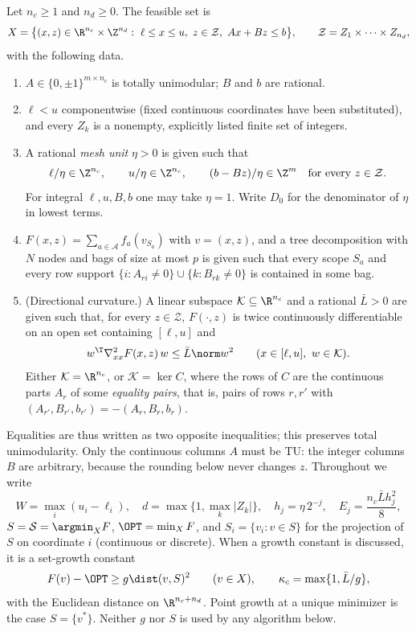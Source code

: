 \begin{definition}\label{def:tu-model}
Let $n_c\ge1$ and $n_d\ge0$. The feasible set is
\[
X=\bigl\{(x,z)\in\R^{n_c}\times\Z^{n_d}:\ \ell\le x\le u,\ z\in\mathcal Z,\
Ax+Bz\le b\bigr\},\qquad \mathcal Z=Z_1\times\dots\times Z_{n_d},
\]
with the following data.
\begin{enumerate}[label=(\roman*)]
\item $A\in\{0,\pm1\}^{m\times n_c}$ is totally unimodular; $B$ and $b$ are
rational.
\item $\ell<u$ componentwise (fixed continuous coordinates have been
substituted), and every $Z_k$ is a nonempty, explicitly listed finite set of
integers.
\item A rational \emph{mesh unit} $\eta>0$ is given such that
\begin{equation}\label{eq:tu-align}
\ell/\eta\in\Z^{n_c},\qquad u/\eta\in\Z^{n_c},\qquad
(b-Bz)/\eta\in\Z^m\quad\text{for every }z\in\mathcal Z .
\end{equation}
For integral $\ell,u,B,b$ one may take $\eta=1$. Write $D_0$ for the
denominator of $\eta$ in lowest terms.
\item $F(x,z)=\sum_{a\in\mathcal A}f_a(v_{S_a})$ with $v=(x,z)$, and a tree
decomposition with $N$ nodes and bags of size at most $p$ is given such that
every scope $S_a$ and every row support
$\{i:A_{ri}\ne0\}\cup\{k:B_{rk}\ne0\}$ is contained in some bag.
\item (Directional curvature.) A linear subspace $\mathcal K\subseteq\R^{n_c}$
and a rational $\bar L>0$ are given such that, for every $z\in\mathcal Z$,
$F(\cdot,z)$ is twice continuously differentiable on an open set containing
$[\ell,u]$ and
\begin{equation}\label{eq:tu-curv}
w^{\T}\nabla^2_{xx}F(x,z)\,w\le\bar L\norm w^2\qquad
(x\in[\ell,u],\ w\in\mathcal K).
\end{equation}
Either $\mathcal K=\R^{n_c}$, or $\mathcal K=\ker C$, where the rows of $C$
are the continuous parts $A_r$ of some \emph{equality pairs}, that is, pairs
of rows $r,r'$ with $(A_{r'},B_{r'},b_{r'})=-(A_r,B_r,b_r)$.
\end{enumerate}
\end{definition}

Equalities are thus written as two opposite inequalities; this preserves
total unimodularity. Only the continuous columns $A$ must be TU: the integer
columns $B$ are arbitrary, because the rounding below never changes $z$.
Throughout we write
\[
W=\max_i(u_i-\ell_i),\quad d=\max\{1,\max_k\lvert Z_k\rvert\},\quad
h_j=\eta\,2^{-j},\quad E_j=\frac{n_c\bar L h_j^2}{8},
\]
$S=\mathcal S=\argmin_XF$, $\OPT=\min_XF$, and $S_i=\{v_i:v\in S\}$ for the projection of
$S$ on coordinate $i$ (continuous or discrete). When a growth constant is
discussed, it is a set-growth constant
\begin{equation}\label{eq:tu-setgrowth}
F(v)-\OPT\ge g\dist(v,S)^2\qquad(v\in X),\qquad
\kappa_c=\max\{1,\bar L/g\},
\end{equation}
with the Euclidean distance on $\R^{n_c+n_d}$. Point growth at a unique
minimizer is the case $S=\{v^*\}$. Neither $g$ nor $S$ is used by any
algorithm below.

